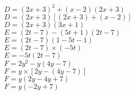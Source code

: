 \begin{corrige}
\begin{enumerate}
\begin{itemize}
            \def\item{}
            \begin{spacing}{1.2}
                \item $D=(2x+3)^2+(x-2)(2x+3)$\\
                {\red $D=(2x+3)\left[(2x+3)+(x-2)\right]$\\$D=(2x+3)(3x+1)$\\}
                \item $E=(2t-7)-(5t+1)(2t-7)$\\
                {\red $E=(2t-7)(1-5t-1)$\\$E=(2t-7)\times (-5t)$\\$E=-5t(2t-7)$\\}
                \item $F=2y^2-y(4y-7)$\\
                {\red $F=y\times\left[2y -(4y-7)\right]$\\$F=y(2y-4y+7)$\\$F=y(-2y+7)$}
            \end{spacing}
        \end{itemize}
    \end{enumerate}
\end{corrige}


